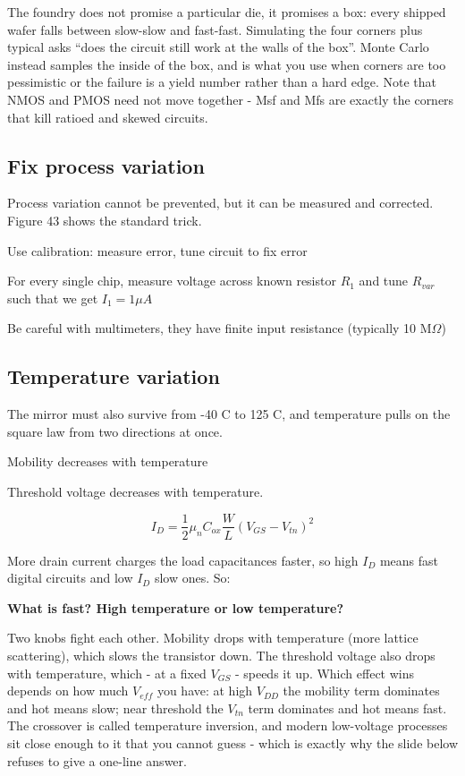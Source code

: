 The foundry does not promise a particular die, it promises a box: every
shipped wafer falls between slow-slow and fast-fast. Simulating the four
corners plus typical asks ``does the circuit still work at the walls of
the box''. Monte Carlo instead samples the inside of the box, and is
what you use when corners are too pessimistic or the failure is a yield
number rather than a hard edge. Note that NMOS and PMOS need not move
together - Msf and Mfs are exactly the corners that kill ratioed and
skewed circuits.

\subsection{Fix process variation}\label{fix-process-variation}

Process variation cannot be prevented, but it can be measured and
corrected. Figure 43 shows the standard trick.

Use calibration: measure error, tune circuit to fix error

For every single chip, measure voltage across known resistor \(R_1\) and
tune \(R_{var}\) such that we get \(I_1 = 1 \mu A\)

Be careful with multimeters, they have finite input resistance
(typically 10 M\(\Omega\))

\subsection{Temperature variation}\label{temperature-variation}

The mirror must also survive from -40 C to 125 C, and temperature pulls
on the square law from two directions at once.

Mobility decreases with temperature

Threshold voltage decreases with temperature.

\[ I_D = \frac{1}{2}\mu_n C_{ox} \frac{W}{L} (V_{GS} - V_{tn})^2\]

More drain current charges the load capacitances faster, so high \(I_D\)
means fast digital circuits and low \(I_D\) slow ones. So:

\textbf{What is fast? High temperature or low temperature?}

Two knobs fight each other. Mobility drops with temperature (more
lattice scattering), which slows the transistor down. The threshold
voltage also drops with temperature, which - at a fixed \(V_{GS}\) -
speeds it up. Which effect wins depends on how much \(V_{eff}\) you
have: at high \(V_{DD}\) the mobility term dominates and hot means slow;
near threshold the \(V_{tn}\) term dominates and hot means fast. The
crossover is called temperature inversion, and modern low-voltage
processes sit close enough to it that you cannot guess - which is
exactly why the slide below refuses to give a one-line answer.

